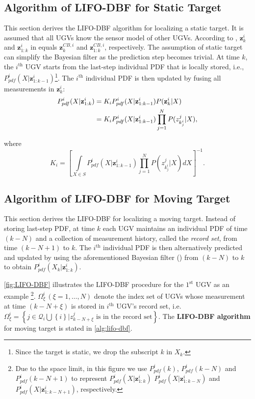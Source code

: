 \documentclass[journal]{IEEEtranTIE}
\theoremstyle{remark}
\newcommand{\X}{X}
\begin{document}
	\subsection{Algorithm of LIFO-DBF for Static Target}\label{subsec:LIFO-dbf-sta-tar} 
	
	This section derives the LIFO-DBF algorithm for localizing a static target. 
	It is assumed that all UGVs know the sensor model of other UGVs.
	According to , $\mathbf{z}^i_k$ and $\mathbf{z}^{i}_{1:k}$ in  equals $\mathbf{z}^{CB,i}_k$ and $\mathbf{z}^{CB,i}_{1:k}$, respectively.
	The assumption of static target can simplify the Bayesian filter as the prediction step becomes trivial. 
	At time $k$, the $i^\text{th}$ UGV starts from the last-step individual PDF that is locally stored, i.e., $P^i_{pdf}(\X|\mathbf{z}^{i}_{1:k-1})$\footnote{Since the target is static, we drop the subscript $k$ in $\X_k$.}. 
	The $i^\text{th}$ individual PDF is then updated by fusing all measurements in $\mathbf{z}^i_k$:
	\small\begin{align*}\label{eqn:LIFO-dbf-sta-tar}
		P^i_{pdf}(\X|\mathbf{z}^{i}_{1:k})&=K_iP^i_{pdf}(\X|\mathbf{z}^i_{1:k-1})P(\mathbf{z}^i_k|\X)\notag\\
		&=K_iP^i_{pdf}(\X|\mathbf{z}^{i}_{1:k-1})\prod\limits_{j=1}^{N}P(z^j_{k^i_j}|\X),
	\end{align*}\normalsize
	
	where
	\small\begin{equation*}
		K_i=\left[\int\limits_{\X\in S} P^i_{pdf}(\X|\mathbf{z}^{i}_{1:k-1})\prod\limits_{j=1}^{N}P(z^j_{k^i_j}|\X)d\X\right]^{-1}.
	\end{equation*}\normalsize
	
	\subsection{Algorithm of LIFO-DBF for Moving Target}\label{subsec:LIFO-dbf-mov-tar}
	This section derives the LIFO-DBF for localizing a moving target. 
	Instead of storing last-step PDF, at time $k$ each UGV maintains an individual PDF of time $(k-N)$ and a collection of measurement history, called the \textit{record set}, from time $(k-N+1)$ to $k$. 
	The $i^\text{th}$ individual PDF is then alternatively predicted and updated by using the aforementioned Bayesian filter () from $(k-N)$ to $k$ to obtain $P^i_{pdf}(\X_k|\mathbf{z}^{i}_{1:k})$.
	
	\cref{fig:LIFO-DBF} illustrates the LIFO-DBF procedure for the $1^\text{st}$ UGV as an example \footnote{Due to the space limit, in this figure we use $P^i_{pdf}(k)$, $P^i_{pdf}(k-N)$ and $P^i_{pdf}(k-N+1)$ to represent $P^i_{pdf}(\X|\mathbf{z}^{i}_{1:k})$ $P^i_{pdf}(\X|\mathbf{z}^{i}_{1:k-N})$ and $P^i_{pdf}(\X|\mathbf{z}^{i}_{1:k-N+1})$, respectively.}.
	$\Omega^i_{\xi}\,\left(\xi=1,\dots,N\right) $ denote the index set of UGVs whose measurement at time $(k-N+\xi)$ is stored in $i^\text{th}$ UGV's record set, i.e. $\Omega^i_{\xi}=\left\lbrace j\in \mathcal{Q}_i \bigcup \left\lbrace i \right\rbrace | z^j_{k-N+\xi} \text{ is in the record set} \right\rbrace$.
	The \textbf{LIFO-DBF algorithm} for moving target is stated in \cref{alg:lifo-dbf}.
	
\end{document}
